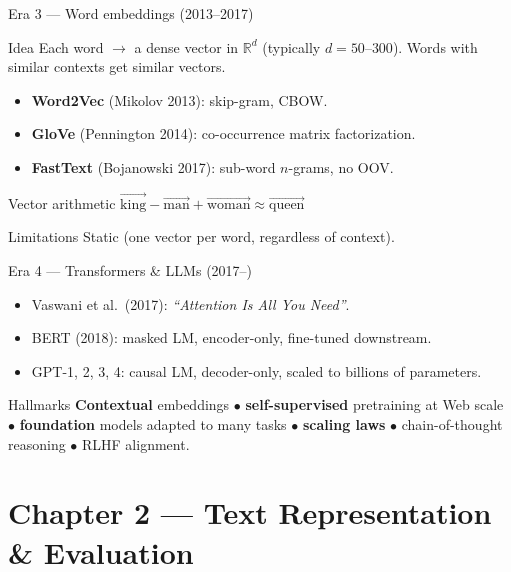 \documentclass[11pt,aspectratio=169]{beamer}
\begin{document}
\begin{frame}{Era 3 --- Word embeddings (2013--2017)}
\begin{block}{Idea}
Each word $\to$ a dense vector in $\mathbb{R}^d$ (typically $d = 50$--$300$). Words with similar contexts get similar vectors.
\end{block}
\begin{itemize}
    \item \textbf{Word2Vec} (Mikolov 2013): skip-gram, CBOW.
    \item \textbf{GloVe} (Pennington 2014): co-occurrence matrix factorization.
    \item \textbf{FastText} (Bojanowski 2017): sub-word $n$-grams, no OOV.
\end{itemize}
\begin{exampleblock}{Vector arithmetic}
$\overrightarrow{\text{king}} - \overrightarrow{\text{man}} + \overrightarrow{\text{woman}} \approx \overrightarrow{\text{queen}}$
\end{exampleblock}
\begin{alertblock}{Limitations}
Static (one vector per word, regardless of context).
\end{alertblock}
\end{frame}

\begin{frame}{Era 4 --- Transformers \& LLMs (2017--)}
\begin{itemize}
    \item Vaswani et al.\ (2017): \emph{``Attention Is All You Need''}.
    \item BERT (2018): masked LM, encoder-only, fine-tuned downstream.
    \item GPT-1, 2, 3, 4: causal LM, decoder-only, scaled to billions of parameters.
\end{itemize}
\vfill
\begin{block}{Hallmarks}
\textbf{Contextual} embeddings $\bullet$ \textbf{self-supervised} pretraining at Web scale $\bullet$ \textbf{foundation} models adapted to many tasks $\bullet$ \textbf{scaling laws} $\bullet$ chain-of-thought reasoning $\bullet$ RLHF alignment.
\end{block}
\end{frame}

\section{Chapter 2 --- Text Representation \& Evaluation}
\end{document}
